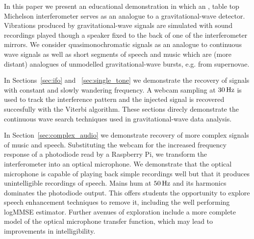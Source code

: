 \documentclass[paper-main.tex]{subfiles}
\begin{document}

In this paper we present an educational demonstration in which an , table top Michelson interferometer serves as an analogue to a gravitational-wave detector. 
Vibrations produced by gravitational-wave signals are simulated with sound recordings played though a speaker fixed to the back of one of the interferometer mirrors. 
We consider quasimonochromatic signals as an analogue to continuous wave signals as well as short segments of speech and music which are (more distant) analogues of unmodelled gravitational-wave bursts, e.g. from supernovae. 


In Sections~\ref{sec:ifo} and ~\ref{sec:single_tone} we demonstrate the recovery of signals with constant and slowly wandering frequency. 
A webcam sampling at $30\,{\rm Hz}$ is used to track the interference pattern and the injected signal is recovered succesfully with the Viterbi algorithm. 
These sections direcly demonstrate the continuous wave search techniques used in gravitational-wave data analysis. 


In Section~\ref{sec:complex_audio} we demonstrate recovery of more complex signals of music and speech. 
Substituting the webcam for the increased frequency response of a photodiode read by a Raspberry Pi, we transform the interferometer into an optical microphone.
We demonstrate that the optical microphone is capable of playing back simple recordings well but that it produces unintelligible recordings of speech. 
Mains hum at $50\,{\rm Hz}$ and its harmonics dominates the photodiode output. 
This offers students the opportunity to explore speech enhancement techniques to remove it, including the well performing logMMSE estimator. 
Further avenues of exploration include a more complete model of the optical microphone transfer function, which may lead to improvements in intelligibility. 
\end{document}
